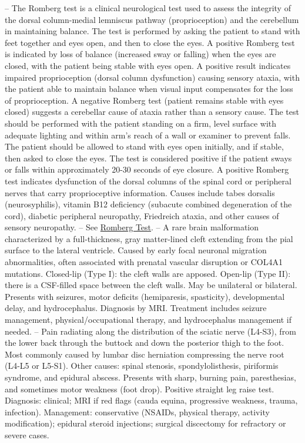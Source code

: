 -- The Romberg test is a clinical neurological test used to assess the integrity of the dorsal column-medial lemniscus pathway (proprioception) and the cerebellum in maintaining balance. The test is performed by asking the patient to stand with feet together and eyes open, and then to close the eyes. A positive Romberg test is indicated by loss of balance (increased sway or falling) when the eyes are closed, with the patient being stable with eyes open. A positive result indicates impaired proprioception (dorsal column dysfunction) causing sensory ataxia, with the patient able to maintain balance when visual input compensates for the loss of proprioception. A negative Romberg test (patient remains stable with eyes closed) suggests a cerebellar cause of ataxia rather than a sensory cause. The test should be performed with the patient standing on a firm, level surface with adequate lighting and within arm's reach of a wall or examiner to prevent falls. The patient should be allowed to stand with eyes open initially, and if stable, then asked to close the eyes. The test is considered positive if the patient sways or falls within approximately 20-30 seconds of eye closure. A positive Romberg test indicates dysfunction of the dorsal columns of the spinal cord or peripheral nerves that carry proprioceptive information. Causes include tabes dorsalis (neurosyphilis), vitamin B12 deficiency (subacute combined degeneration of the cord), diabetic peripheral neuropathy, Friedreich ataxia, and other causes of sensory neuropathy.
-- See \hyperlink{Romberg Test}{Romberg Test}.
-- A rare brain malformation characterized by a full-thickness, gray matter-lined cleft extending from the pial surface to the lateral ventricle. Caused by early focal neuronal migration abnormalities, often associated with prenatal vascular disruption or COL4A1 mutations. Closed-lip (Type I): the cleft walls are apposed. Open-lip (Type II): there is a CSF-filled space between the cleft walls. May be unilateral or bilateral. Presents with seizures, motor deficits (hemiparesis, spasticity), developmental delay, and hydrocephalus. Diagnosis by MRI. Treatment includes seizure management, physical/occupational therapy, and hydrocephalus management if needed.
-- Pain radiating along the distribution of the sciatic nerve (L4-S3), from the lower back through the buttock and down the posterior thigh to the foot. Most commonly caused by lumbar disc herniation compressing the nerve root (L4-L5 or L5-S1). Other causes: spinal stenosis, spondylolisthesis, piriformis syndrome, and epidural abscess. Presents with sharp, burning pain, paresthesias, and sometimes motor weakness (foot drop). Positive straight leg raise test. Diagnosis: clinical; MRI if red flags (cauda equina, progressive weakness, trauma, infection). Management: conservative (NSAIDs, physical therapy, activity modification); epidural steroid injections; surgical discectomy for refractory or severe cases.
